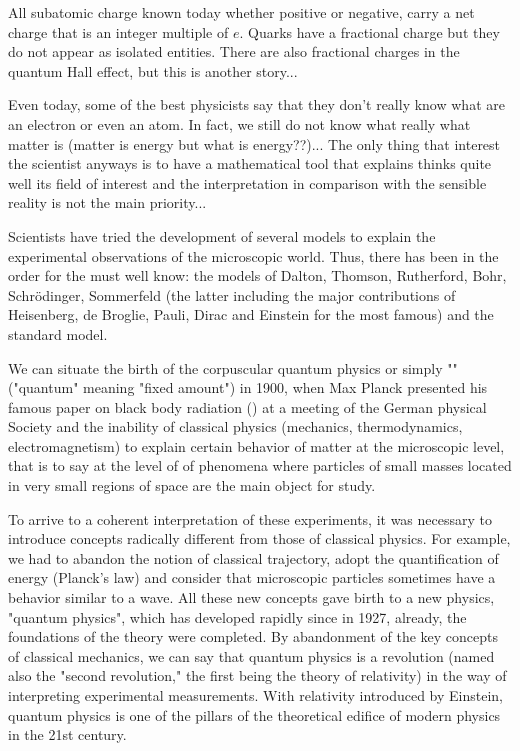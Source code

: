	All subatomic charge known today whether positive or negative, carry a net charge that is an integer multiple of $e$. Quarks have a fractional charge but they do not appear as isolated entities. There are also fractional charges in the quantum Hall effect, but this is another story...

	Even today, some of the best physicists say that they don't really know what are an electron or even an atom. In fact, we still do not know what really what matter is (matter is energy but what is energy??)... The only thing that interest the scientist anyways is to have a mathematical tool that explains thinks quite well its field of interest and the interpretation in comparison with the sensible reality is not the main priority...

	Scientists have tried the development of several models to explain the experimental  observations of the microscopic world. Thus, there has been in the order for the must well know: the models of Dalton, Thomson, Rutherford, Bohr, Schrödinger, Sommerfeld (the latter including the major contributions of Heisenberg, de Broglie, Pauli, Dirac and Einstein for the most famous) and the standard model.

	We can situate the birth of the corpuscular quantum physics or simply "" ("quantum" meaning "fixed amount") in 1900, when Max Planck presented his famous paper on black body radiation () at a meeting of the German physical Society and the inability of classical physics (mechanics, thermodynamics, electromagnetism) to explain certain behavior of matter at the microscopic level, that is to say at the level of of phenomena where particles of small masses located in very small regions of space are the main object for study.

	To arrive to a coherent interpretation of these experiments, it was necessary to introduce concepts radically different from those of classical physics. For example, we had to abandon the notion of classical trajectory, adopt the  quantification of energy (Planck's law) and consider that microscopic particles sometimes have a behavior similar to a wave. All these new concepts gave birth to a new physics, "quantum physics", which has developed rapidly since  in 1927, already, the foundations of the theory were completed. By abandonment of the key concepts of classical mechanics, we can say that quantum physics is a revolution (named also the "second revolution," the first being the theory of relativity) in the way of interpreting experimental measurements. With relativity introduced by Einstein, quantum physics is one of the pillars of the theoretical edifice of modern physics in the 21st century.


